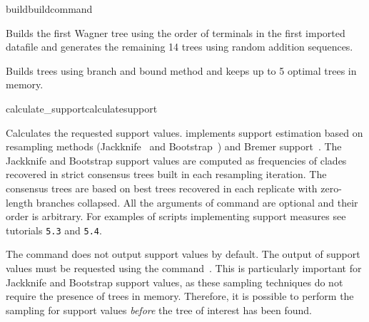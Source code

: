 \begin{command}{build}{buildcommand}
\begin{poyexamples}
            {Builds the first Wagner tree using the order of terminals in the first
            imported datafile and generates the remaining
            14 trees using random addition sequences.}
            
            {Builds trees using branch and bound method and keeps up to
            5 optimal trees in memory.}
                    
	\end{poyexamples}

\end{command}


\begin{command}{calculate\_support}{calculatesupport}


	\begin{poydescription} 
            Calculates the requested support values. \poy implements support
            estimation based on resampling methods (Jackknife~\cite{Farrisetal1996} 
            and Bootstrap~\cite{Felsenstein1985}) and Bremer support~\cite{Bremer1988, Kallersjoetal1992}. 
            The Jackknife and Bootstrap support values are computed as
            frequencies of clades recovered in strict consensus trees built in each resampling
            iteration. The consensus trees are based on best trees recovered in each replicate
            with zero-length branches collapsed.
            All the arguments of  command are optional and
            their order is arbitrary.  For examples of scripts implementing support measures see 
           tutorials \texttt{5.3} and \texttt{5.4}. 
            
	  The  command does not output support values by default. The output of
            support values must be requested using the command~. This is particularly important for Jackknife and Bootstrap support values, as these sampling techniques
            do not require the presence of trees in memory. Therefore, it is possible to perform the sampling for support values \emph{before}
            the tree of interest has been found.
                    \end{poydescription}
            

\end{command}
